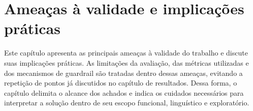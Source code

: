 \chapter{Ameaças à validade e implicações práticas}
\label{cap:ameacas-validade-implicacoes-praticas}

Este capítulo apresenta as principais ameaças à validade do trabalho e discute suas implicações práticas. As limitações da avaliação, das métricas utilizadas e dos mecanismos de guardrail são tratadas dentro dessas ameaças, evitando a repetição de pontos já discutidos no capítulo de resultados. Dessa forma, o capítulo delimita o alcance dos achados e indica os cuidados necessários para interpretar a solução dentro de seu escopo funcional, linguístico e exploratório.






